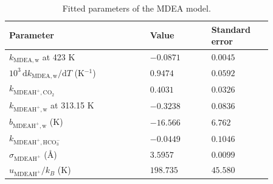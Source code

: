 \begin{table}[pos=!htbp]\small\setlength{\tabcolsep}{2pt}\caption{Fitted parameters of the MDEA model.}\label{tab:mdea-fitted}
\begin{tabular}{@{}>{\raggedright\arraybackslash}p{0.46\linewidth}>{\raggedright\arraybackslash}p{0.2\linewidth}>{\raggedright\arraybackslash}p{0.2\linewidth}@{}}
\toprule Parameter & Value & Standard error \\ \midrule
$k_{\mathrm{MDEA,w}}$ at 423 K & $\boldsymbol{-0.0871}$ & $0.0045$ \\
$10^{3}\,\mathrm{d}k_{\mathrm{MDEA,w}}/\mathrm{d}T$ (K$^{-1}$) & $\boldsymbol{0.9474}$ & $0.0592$ \\
$k_{\mathrm{MDEAH^+,CO_2}}$ & $\boldsymbol{0.4031}$ & $0.0326$ \\
$k_{\mathrm{MDEAH^+,w}}$ at 313.15 K & $\boldsymbol{-0.3238}$ & $0.0836$ \\
$b_{\mathrm{MDEAH^+,w}}$ (K) & $\boldsymbol{-16.566}$ & $6.762$ \\
$k_{\mathrm{MDEAH^+,HCO_3^-}}$ & $\boldsymbol{-0.0449}$ & $0.1046$ \\
$\sigma_{\mathrm{MDEAH^+}}$ (\AA) & $\boldsymbol{3.5957}$ & $0.0099$ \\
$u_{\mathrm{MDEAH^+}}/k_B$ (K) & $\boldsymbol{198.735}$ & $45.580$ \\
\bottomrule\end{tabular}
\par{}\end{table}
